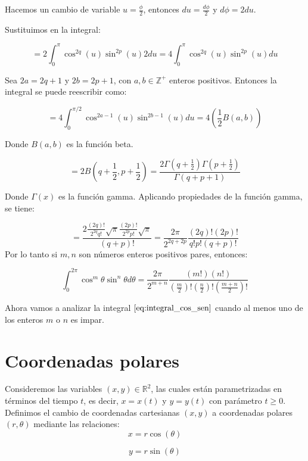 Hacemos un cambio de variable $u=\frac{\phi}{2}$, entonces $du=\frac{d\phi}{2}$ y $d\phi=2du$.

Sustituimos en la integral:

\[
    =2\int_{0}^{\pi}\cos^{2q}\left(u\right)\sin^{2p}\left(u\right) 2du = 4\int_{0}^{\pi}\cos^{2q}\left(u\right)\sin^{2p}\left(u\right) du
\]

Sea $2a=2q+1$ y $2b=2p+1$, con $a,b\in\mathbb{Z}^+$ enteros positivos. Entonces la integral se puede reescribir como:

\[
    =4\int_{0}^{\pi/2}\cos^{2a-1}\left(u\right)\sin^{2b-1}\left(u\right) du = 4(\frac{1}{2}B(a,b))
\]

Donde $B(a,b)$ es la función beta.

\[
    =2B(q+\frac{1}{2},p+\frac{1}{2})=\frac{2\Gamma(q+\frac{1}{2})\Gamma(p+\frac{1}{2})}{\Gamma(q+p+1)}
\]

Donde $\Gamma(x)$ es la función gamma. Aplicando propiedades de la función gamma, se tiene:

\[
=\frac{2\frac{(2q)!}{2^{2q}q!}\sqrt{\pi}\frac{(2p)!}{2^{2p}p!}\sqrt{\pi}}{(q+p)!}=\frac{2\pi}{2^{2q+2p}}\frac{(2q)!(2p)!}{q!p!(q+p)!}
\]
Por lo tanto si $m,n$ son números enteros positivos pares, entonces:

\begin{equation}\label{eq: integral_cos_sen_pares}
    \int_{0}^{2\pi}\cos^m\theta\sin^n\theta d\theta = \frac{2\pi}{2^{m+n}}\frac{(m!)(n!)}{(\frac{m}{2})!(\frac{n}{2})!(\frac{m+n}{2})!}
\end{equation}

Ahora vamos a analizar la integral $\eqref{eq:integral_cos_sen}$ cuando al menos uno de los enteros $m$ o $n$ es impar.


\section{Coordenadas polares}

Consideremos las variables $(x,y)\in\mathbb{R}^2$, las cuales están parametrizadas en términos del tiempo $t$, es decir, $x=x(t)$ y $y=y(t)$ con parámetro $t\geq0$. Definimos el cambio de coordenadas cartesianas $(x,y)$
a coordenadas polares $(r,\theta)$ mediante las relaciones:
\begin{equation}\label{eq: xpolar}
	x=r\cos(\theta)
\end{equation}

\begin{equation}\label{eq: ypolar}
	y=r\sin(\theta)
\end{equation}

